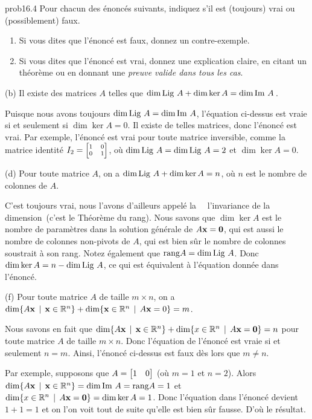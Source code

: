 \bigskip
\begin{sol}{prob16.4} Pour chacun des énoncés suivants, indiquez s'il est (toujours) vrai
ou (possiblement) faux.   
   \smallskip    
\begin{enumerate}[$\bullet$]
\item Si vous dites que l'\'enonc\'e est faux, donnez un contre-exemple.   
\item Si vous dites que l'\'enonc\'e est vrai, donnez une explication claire, en citant un théorème ou en donnant une {\it preuve valide dans tous les cas}. 
\end{enumerate}
\medskip
(b)  Il existe des matrices $A$ telles que $\dim \operatorname{Lig\,} A+ \dim \ker A= \dim \operatorname{Im}\, A$\,.

\soln Puisque nous avons toujours $\dim \operatorname{Lig\,} A=\dim \operatorname{Im}\, A$, l'équation ci-dessus est vraie si et seulement si $\dim \ker A=0$. Il existe de telles matrices, donc l'énoncé est vrai. Par exemple, l'énoncé est vrai pour toute matrice inversible, comme la matrice identité $I_2=\scriptsize\bmatrix 1&0\\0&1\endbmatrix$, où $\dim \operatorname{Lig\,} A=\dim \operatorname{Lig\,} A=2$ et $\dim \ker A=0$.
\medskip
 

(d)  Pour toute matrice $A$, on a $\dim \operatorname{Lig\,} A+ \dim \ker A= n$, o\`u $n$ est le nombre de colonnes de $A$.

\soln C'est toujours vrai, nous l'avons d'ailleurs appelé la \ \og\ l'invariance de la dimension\ \fg (c'est le Théorème du rang). Nous savons que $\dim \ker A$ est le nombre de paramètres dans la solution générale de $A\mathbf{x}=\mathbf{0}$, qui est aussi le nombre de colonnes non-pivots de $A$, qui est bien sûr le nombre de colonnes soustrait à son rang. Notez également que $\textrm{rang} A=\dim \operatorname{Lig\,} A$. Donc $\dim \ker A = n-\dim \operatorname{Lig\,} A$, ce qui est équivalent à l'équation donnée dans l'énoncé.
\medskip

(f) Pour toute matrice $A$ de taille $m\times n$, on a  $\dim \{A\mathbf{x}\, \mid \, \mathbf{x}\in \mathbb{R}^n\} + \dim\{\mathbf{x} \in \mathbb{R}^n \, \mid \, A\mathbf{x}=0\}= m$.

\soln Nous savons en fait que $\dim \{A\mathbf{x}\, \mid \, \mathbf{x}\in \mathbb{R}^n\} + \dim \{x \in \mathbb{R}^n \, \mid \, A\mathbf{x}=\mathbf{0}\}= n$ pour toute matrice $A$ de taille $m\times n$. Donc l'équation de l'énoncé est vraie si et seulement $n=m$. Ainsi, l'énoncé ci-dessus est faux dès lors que $m\neq n$. 

Par exemple, supposons que $A=\bmatrix 1&0 \endbmatrix$ (où $m=1$ et $n=2$). Alors
$\dim \{A\mathbf{x}\, \mid \, \mathbf{x}\in \mathbb{R}^n\}=\dim \operatorname{Im}\, A= \textrm{rang} A=1$ et $\dim \{x \in \mathbb{R}^n \, \mid \, A\mathbf{x}=\mathbf{0}\}=\dim \ker A=1$. Donc l'équation dans l'énoncé devient $1+1=1$ et on l'on voit tout de suite qu'elle est bien sûr fausse. D'où le résultat.
\medskip
 



\end{sol}
